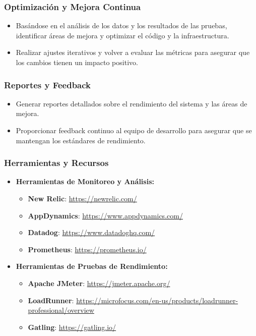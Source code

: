 \documentclass{article}
\begin{document}
\subsubsection{Optimización y Mejora Continua}
\begin{itemize}
    \item Basándose en el análisis de los datos y los resultados de las pruebas, identificar áreas de mejora y optimizar el código y la infraestructura.
    \item Realizar ajustes iterativos y volver a evaluar las métricas para asegurar que los cambios tienen un impacto positivo.
\end{itemize}

\subsubsection{Reportes y Feedback}
\begin{itemize}
    \item Generar reportes detallados sobre el rendimiento del sistema y las áreas de mejora.
    \item Proporcionar feedback continuo al equipo de desarrollo para asegurar que se mantengan los estándares de rendimiento.
\end{itemize}

\subsubsection{Herramientas y Recursos}
\begin{itemize}
    \item \textbf{Herramientas de Monitoreo y Análisis:}
    \begin{itemize}
        \item \textbf{New Relic}: \url{https://newrelic.com/}
        \item \textbf{AppDynamics}: \url{https://www.appdynamics.com/}
        \item \textbf{Datadog}: \url{https://www.datadoghq.com/}
        \item \textbf{Prometheus}: \url{https://prometheus.io/}
    \end{itemize}
    \item \textbf{Herramientas de Pruebas de Rendimiento:}
    \begin{itemize}
        \item \textbf{Apache JMeter}: \url{https://jmeter.apache.org/}
        \item \textbf{LoadRunner}: \url{https://microfocus.com/en-us/products/loadrunner-professional/overview}
        \item \textbf{Gatling}: \url{https://gatling.io/}
    \end{itemize}
\end{itemize}


\printbibliography
\end{document}
